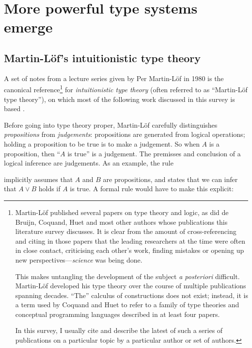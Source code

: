 \documentclass[12pt,toc=bibliography,numbers=noendperiod,
               footnotes=multiple,twoside]{scrartcl}
\begin{document}
\section{More powerful type systems emerge}

\subsection{Martin-Löf's intuitionistic type theory}

A set of notes from a lecture series given by Per Martin-Löf in 1980 is the canonical reference\footnote{%
Martin-Löf published several papers on type theory and logic, as did de Bruijn, Coquand, Huet and most other authors whose publications this literature survey discusses. It is clear from the amount of cross-referencing and citing in those papers that the leading researchers at the time were often in close contact, criticising each other's work, finding mistakes or opening up new perspectives---\emph{science} was being done.

This makes untangling the development of the subject \emph{a posteriori} difficult. Martin-Löf developed his type theory over the course of multiple publications spanning decades. \enquote{The} calculus of constructions does not exist; instead, it is a term used by Coquand and Huet to refer to a family of type theories and conceptual programming languages described in at least four papers.

In this survey, I usually cite and describe the latest of such a series of publications on a particular topic by a particular author or set of authors.}
%
for \emph{intuitionistic type theory} (often referred to as \enquote{Martin-Löf type theory}), on which most of the following work discussed in this survey is based \autocite{sambin_intuitionistic_1984}.

Before going into type theory proper, Martin-Löf carefully distinguishes \emph{propositions} from \emph{judgements}: propositions are generated from logical operations; holding a proposition to be true is to make a judgement. So when \(A\) is a proposition, then \enquote{\(A\) is true} is a judgement. The premisses and conclusion of a logical inference are judgements. As an example, the rule

\begin{prooftree}
\end{prooftree}

implicitly assumes that \(A\) and \(B\) are propositions, and states that we can infer that \(A \vee B\) holds if \(A\) is true. A formal rule would have to make this explicit:
\end{document}
